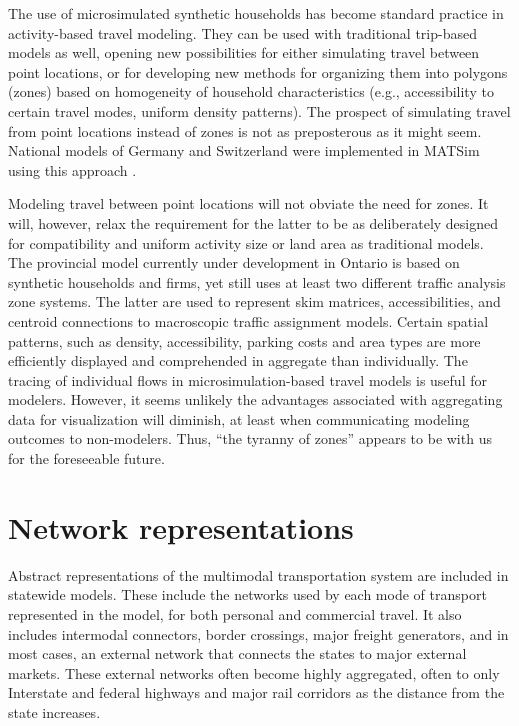The use of microsimulated synthetic households has become standard practice in activity-based travel modeling. They can be used with traditional trip-based models as well, opening new possibilities for either simulating travel between point locations, or for developing new methods for organizing them into polygons (zones) based on homogeneity of household characteristics (e.g., accessibility to certain travel modes, uniform density patterns). The prospect of simulating travel from point locations instead of zones is not as preposterous as it might seem. National models of Germany and Switzerland were implemented in MATSim using this approach \citep{balmer08}.

Modeling travel between point locations will not obviate the need for zones. It will, however, relax the requirement for the latter to be as deliberately designed for compatibility and uniform activity size or land area as traditional models. The provincial model currently under development in Ontario is based on synthetic households and firms, yet still uses at least two different traffic analysis zone systems. The latter are used to represent skim matrices, accessibilities, and centroid connections to macroscopic traffic assignment models. Certain spatial patterns, such as density, accessibility, parking costs and area types are more efficiently displayed and comprehended in aggregate than individually. The tracing of individual flows in microsimulation-based travel models is useful for modelers. However, it seems unlikely the advantages associated with aggregating data for visualization will diminish, at least when communicating modeling outcomes to non-modelers. Thus, ``the tyranny of zones'' \citep{spiekermann99} appears to be with us for the foreseeable future.

\section{Network representations}\label{sec:network-representations}

Abstract representations of the multimodal transportation system are included in statewide models. These include the networks used by each mode of transport represented in the model, for both personal and commercial travel. It also includes intermodal connectors, border crossings, major freight generators, and in most cases, an external network that connects the states to major external markets. These external networks often become highly aggregated, often to only Interstate and federal highways and major rail corridors as the distance from the state increases.

